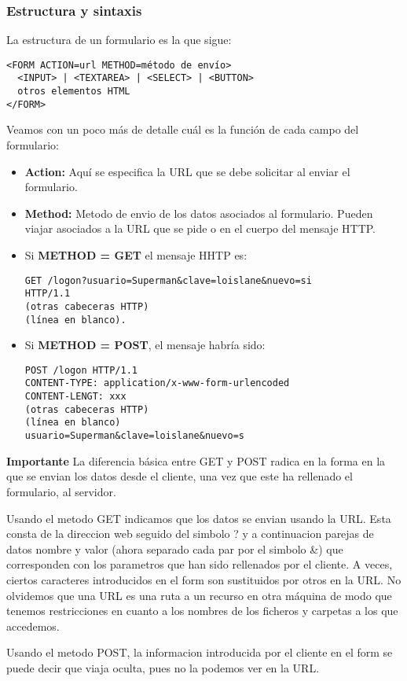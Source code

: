 \documentclass{apuntes}
\begin{document}
\newpage
\subsubsection{Estructura y sintaxis}
La estructura de un formulario es la que sigue:
\begin{verbatim}
<FORM ACTION=url METHOD=método de envío>
  <INPUT> | <TEXTAREA> | <SELECT> | <BUTTON>
  otros elementos HTML
</FORM>
\end{verbatim}

Veamos con un poco más de detalle cuál es la función de cada campo del formulario:
\begin{itemize}
\item \textbf{Action:} Aquí se especifica la URL que se debe solicitar al enviar el formulario.
\item \textbf{Method:} Metodo de envio de los datos asociados al formulario. Pueden viajar asociados a la URL que se pide o en el cuerpo del mensaje HTTP.
\item Si \textbf{METHOD = GET} el mensaje HHTP es:
\begin{verbatim}
GET /logon?usuario=Superman&clave=loislane&nuevo=si
HTTP/1.1
(otras cabeceras HTTP)
(línea en blanco).
\end{verbatim}
\item Si \textbf{METHOD = POST}, el mensaje habría sido:
\begin{verbatim}
POST /logon HTTP/1.1
CONTENT-TYPE: application/x-www-form-urlencoded
CONTENT-LENGT: xxx
(otras cabeceras HTTP)
(línea en blanco)
usuario=Superman&clave=loislane&nuevo=s
\end{verbatim}
\end{itemize}
\textbf{Importante} La diferencia básica entre GET y POST radica en la forma en la que se envian los datos desde el cliente, una vez que este ha rellenado el formulario, al servidor.

Usando el metodo GET indicamos que los datos se envian usando la URL. Esta consta de la direccion web seguido del simbolo ? y a continuacion parejas de datos nombre y valor (ahora separado cada par por el simbolo \&) que corresponden con los parametros que han sido rellenados por el cliente. A veces, ciertos caracteres introducidos en el form son sustituidos por otros en la URL. No olvidemos que una URL es una ruta a un recurso en otra máquina de modo que tenemos restricciones en cuanto a los nombres de los ficheros y carpetas a los que accedemos.

Usando el metodo POST, la informacion introducida por el cliente en el form se puede decir que viaja oculta, pues no la podemos ver en la URL.
\end{document}
